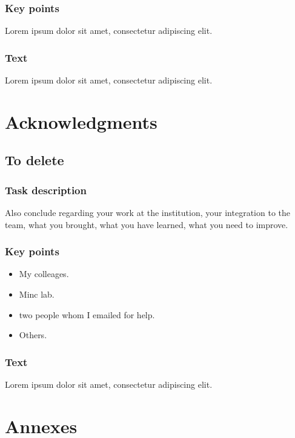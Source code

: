 \documentclass[11pt,a4paper]{article}
\begin{document}
\subsubsection{Key points}

Lorem ipsum dolor sit amet, consectetur adipiscing elit.

\subsubsection{Text}

Lorem ipsum dolor sit amet, consectetur adipiscing elit.

\section{Acknowledgments}

\subsection{To delete}

\subsubsection{Task description}
Also conclude regarding your work at the institution, your integration 
to the team, what you brought, what you have learned, what you need to 
improve.

\subsubsection{Key points}

\begin{itemize}
    \item My colleages.
    \item Minc lab.
    \item two people whom I emailed for help.
    \item Others.
\end{itemize}

\subsubsection{Text}

Lorem ipsum dolor sit amet, consectetur adipiscing elit.

\printbibliography

\section{Annexes}
\end{document}
